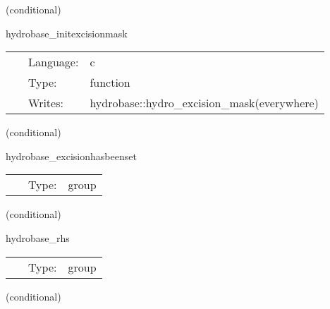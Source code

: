    (conditional) 

\hspace{5mm} hydrobase\_initexcisionmask 

\hspace{5mm}{\it initialize hydro excision mask to 'no excision everywhere' } 


\hspace{5mm}

 \begin{tabular*}{160mm}{cll} 
~ & Language:  & c \\ 
~ & Type:  & function \\ 
~ & Writes:  & hydrobase::hydro\_excision\_mask(everywhere) \\ 
\end{tabular*} 


\vspace{5mm}

   (conditional) 

\hspace{5mm} hydrobase\_excisionhasbeenset 

\hspace{5mm}{\it group to schedule thorns changing the mask before and thorns using the mask after } 


\hspace{5mm}

 \begin{tabular*}{160mm}{cll} 
~ & Type:  & group \\ 
\end{tabular*} 


\vspace{5mm}

   (conditional) 

\hspace{5mm} hydrobase\_rhs 

\hspace{5mm}{\it groups for scheduling tasks for calculating rhs of hydro variables } 


\hspace{5mm}

 \begin{tabular*}{160mm}{cll} 
~ & Type:  & group \\ 
\end{tabular*} 


\vspace{5mm}

   (conditional) 

